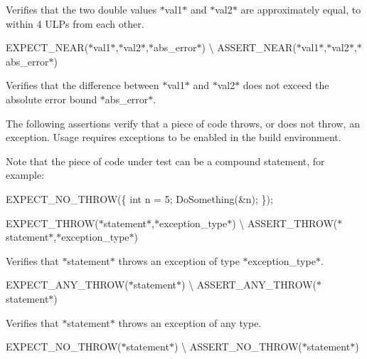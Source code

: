Verifies that the two {\ttfamily double} values $\ast${\ttfamily val1}$\ast$ and $\ast${\ttfamily val2}$\ast$ are approximately equal, to within 4 U\+L\+Ps from each other.

{\ttfamily E\+X\+P\+E\+C\+T\+\_\+\+N\+E\+AR(}$\ast${\ttfamily val1}$\ast${\ttfamily ,}$\ast${\ttfamily val2}$\ast${\ttfamily ,}$\ast${\ttfamily abs\+\_\+error}$\ast${\ttfamily )} \textbackslash{} {\ttfamily A\+S\+S\+E\+R\+T\+\_\+\+N\+E\+AR(}$\ast${\ttfamily val1}$\ast${\ttfamily ,}$\ast${\ttfamily val2}$\ast${\ttfamily ,}$\ast${\ttfamily abs\+\_\+error}$\ast${\ttfamily )}

Verifies that the difference between $\ast${\ttfamily val1}$\ast$ and $\ast${\ttfamily val2}$\ast$ does not exceed the absolute error bound $\ast${\ttfamily abs\+\_\+error}$\ast$.

The following assertions verify that a piece of code throws, or does not throw, an exception. Usage requires exceptions to be enabled in the build environment.

Note that the piece of code under test can be a compound statement, for example\+:


\begin{DoxyCode}
EXPECT\_NO\_THROW(\{
  \textcolor{keywordtype}{int} n = 5;
  DoSomething(&n);
\});
\end{DoxyCode}


{\ttfamily E\+X\+P\+E\+C\+T\+\_\+\+T\+H\+R\+OW(}$\ast${\ttfamily statement}$\ast${\ttfamily ,}$\ast${\ttfamily exception\+\_\+type}$\ast${\ttfamily )} \textbackslash{} {\ttfamily A\+S\+S\+E\+R\+T\+\_\+\+T\+H\+R\+OW(}$\ast${\ttfamily statement}$\ast${\ttfamily ,}$\ast${\ttfamily exception\+\_\+type}$\ast${\ttfamily )}

Verifies that $\ast${\ttfamily statement}$\ast$ throws an exception of type $\ast${\ttfamily exception\+\_\+type}$\ast$.

{\ttfamily E\+X\+P\+E\+C\+T\+\_\+\+A\+N\+Y\+\_\+\+T\+H\+R\+OW(}$\ast${\ttfamily statement}$\ast${\ttfamily )} \textbackslash{} {\ttfamily A\+S\+S\+E\+R\+T\+\_\+\+A\+N\+Y\+\_\+\+T\+H\+R\+OW(}$\ast${\ttfamily statement}$\ast${\ttfamily )}

Verifies that $\ast${\ttfamily statement}$\ast$ throws an exception of any type.

{\ttfamily E\+X\+P\+E\+C\+T\+\_\+\+N\+O\+\_\+\+T\+H\+R\+OW(}$\ast${\ttfamily statement}$\ast${\ttfamily )} \textbackslash{} {\ttfamily A\+S\+S\+E\+R\+T\+\_\+\+N\+O\+\_\+\+T\+H\+R\+OW(}$\ast${\ttfamily statement}$\ast${\ttfamily )}

